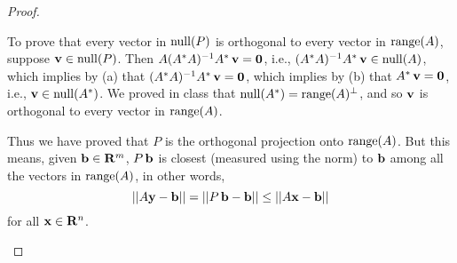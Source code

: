 \documentclass[11pt]{amsart}
\begin{document}
\begin{enumerate}[(1)]
\begin{proof}
\begin{enumerate}
To prove that every vector in $\operatorname{null}(P)$ is orthogonal to every vector in $\operatorname{range}(A)$, suppose $\mathbf v \in \operatorname{null}(P)$.
Then $A (A^* A)^{ -1 } A^* \, \mathbf v = \mathbf 0$, i.e., $(A^* A)^{ -1 } A^* \, \mathbf v \in \operatorname{null}(A)$, which implies by (a) that $(A^* A)^{ -1 } A^* \, \mathbf v = \mathbf 0$, which implies by (b) that $A^* \, \mathbf v = \mathbf 0$, i.e., $\mathbf v \in \operatorname{null}(A^*)$. We proved in class that $\operatorname{null}(A^*) = \operatorname{range}(A)^\perp$, and so $\mathbf v$ is orthogonal to every vector in $\operatorname{range}(A)$.

Thus we have proved that $P$ is the orthogonal projection onto $\operatorname{range}(A)$.
But this means, given $\mathbf b \in \mathbf{R}^m$, $P \, \mathbf b$ is closest (measured using the norm) to $\mathbf b$ among all the vectors in $\operatorname{range}(A)$, in other words,
\[
  \left|\left|  A \mathbf y - \mathbf b  \right|\right| = \left|\left|  P \, \mathbf b - \mathbf b  \right|\right| \le \left|\left|  A \mathbf x - \mathbf b  \right|\right|
\]
for all $\mathbf x \in \mathbf{R}^n$. \qedhere

\end{enumerate}
\end{proof}

\end{enumerate}
\end{document}
